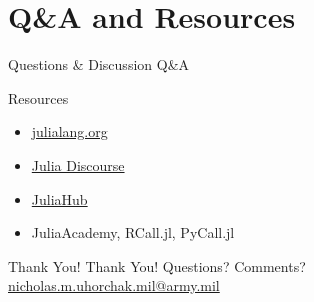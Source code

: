 \documentclass{beamer}
\begin{document}
\section{Q\&A and Resources}

\begin{frame}{Questions \& Discussion}
    \centering
    \Huge{Q\&A}
\end{frame}

\begin{frame}{Resources}
\begin{itemize}
    \item \href{https://julialang.org}{julialang.org}
    \item \href{https://discourse.julialang.org}{Julia Discourse}
    \item \href{https://juliahub.com/packages}{JuliaHub}
    \item JuliaAcademy, RCall.jl, PyCall.jl
\end{itemize}
\end{frame}

\begin{frame}{Thank You!}
    \centering
    \Huge{Thank You!}
    \vspace{1cm}
    \Large{Questions? Comments?}
    \vspace{0.5cm}
    \normalsize
    \href{mailto:nicholas.m.uhorchak.mil@army.mil}{nicholas.m.uhorchak.mil@army.mil}
\end{frame}
\end{document}
